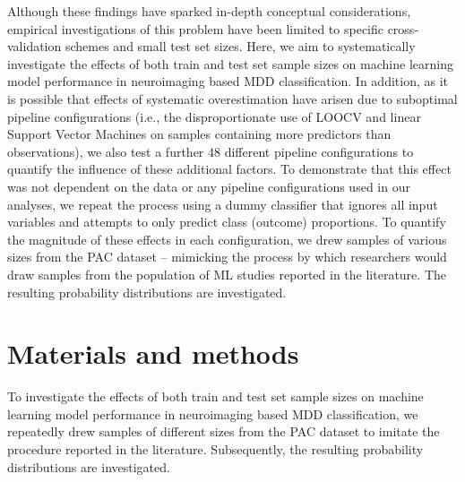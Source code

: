 \documentclass{article}
\begin{document}
    Although these findings have sparked in-depth conceptual considerations\cite{Hahn2019}, empirical investigations of this problem have been limited to specific cross-validation schemes and small test set sizes\cite{Varoquaux2018}. Here, we aim to systematically investigate the effects of both train and test set sample sizes on machine learning model performance in neuroimaging based MDD classification. In addition, as it is possible that effects of systematic overestimation have arisen due to suboptimal pipeline configurations (i.e., the disproportionate use of LOOCV and linear Support Vector Machines on samples containing more predictors than observations), we also test a further \num{48} different pipeline configurations to quantify the influence of these additional factors. To demonstrate that this effect was not dependent on the data or any pipeline configurations used in our analyses, we repeat the process using a dummy classifier that ignores all input variables and attempts to only predict class (outcome) proportions. To quantify the magnitude of these effects in each configuration, we drew samples of various sizes from the PAC dataset – mimicking the process by which researchers would draw samples from the population of ML studies reported in the literature. The resulting probability distributions are investigated.

    \section{Materials and methods}
    To investigate the effects of both train and test set sample sizes on machine learning model performance in neuroimaging based MDD classification, we repeatedly drew samples of different sizes from the PAC dataset to imitate the procedure reported in the literature. Subsequently, the resulting probability distributions are investigated.
\end{document}
